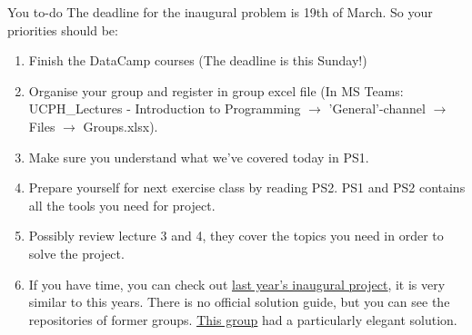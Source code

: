 \documentclass[10pt,danish,t,10pt]{beamer}
\begin{document}
\begin{frame}{You to-do}
    The deadline for the inaugural problem is 19th of March. So your priorities should be:
    \begin{enumerate}
        \item Finish the DataCamp courses (The deadline is this Sunday!)
        \item Organise your group and register in group excel file (In MS Teams: UCPH\_Lectures - Introduction to Programming $\rightarrow$ 'General'-channel $\rightarrow$ Files $\rightarrow$ Groups.xlsx).
        \item Make sure you understand  what we've covered today in PS1.
        \item Prepare yourself for next exercise class by reading PS2. PS1 and PS2 contains all the tools you need for project.
        \item Possibly review lecture 3 and 4, they cover the topics you need in order to solve the project.
        \item If you have time, you can check out \href{https://github.com/NumEconCopenhagen/lectures-2020/blob/master/projects/InauguralProject.pdf}{\underline{last year's inaugural project}}, it is very similar to this years. There is no official solution guide, but you can see the repositories of former groups. \href{https://github.com/NumEconCopenhagen/projects-2020-kongeraekken-1/tree/master/inauguralproject}{\underline{This group}} had a particularly elegant solution. 
    \end{enumerate}
    
\end{frame}
\end{document}
